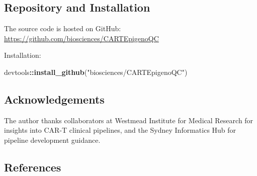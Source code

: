 \documentclass[
]{article}
\newenvironment{Shaded}{\begin{snugshade}}{\end{snugshade}}
\newcommand{\FunctionTok}[1]{\textcolor[rgb]{0.13,0.29,0.53}{\textbf{#1}}}
\newcommand{\NormalTok}[1]{#1}
\newcommand{\SpecialCharTok}[1]{\textcolor[rgb]{0.81,0.36,0.00}{\textbf{#1}}}
\newcommand{\StringTok}[1]{\textcolor[rgb]{0.31,0.60,0.02}{#1}}
\begin{document}
\subsection{Repository and
Installation}\label{repository-and-installation}

The source code is hosted on GitHub:\\
\url{https://github.com/biosciences/CARTEpigenoQC}

Installation:

\begin{Shaded}
\begin{Highlighting}[]
\NormalTok{devtools}\SpecialCharTok{::}\FunctionTok{install\_github}\NormalTok{(}\StringTok{"biosciences/CARTEpigenoQC"}\NormalTok{)}
\end{Highlighting}
\end{Shaded}

\subsection{Acknowledgements}\label{acknowledgements}

The author thanks collaborators at Westmead Institute for Medical
Research for insights into CAR-T clinical pipelines, and the Sydney
Informatics Hub for pipeline development guidance.

\subsection*{References}\label{references}
\end{document}
